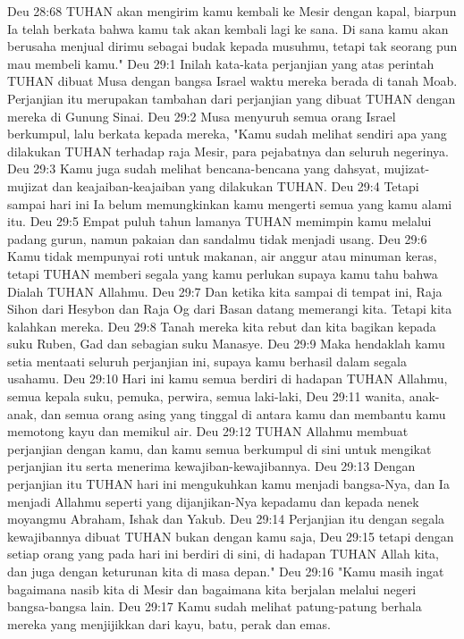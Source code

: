 Deu 28:68  TUHAN akan mengirim kamu kembali ke Mesir dengan kapal, biarpun Ia telah berkata bahwa kamu tak akan kembali lagi ke sana. Di sana kamu akan berusaha menjual dirimu sebagai budak kepada musuhmu, tetapi tak seorang pun mau membeli kamu."
Deu 29:1  Inilah kata-kata perjanjian yang atas perintah TUHAN dibuat Musa dengan bangsa Israel waktu mereka berada di tanah Moab. Perjanjian itu merupakan tambahan dari perjanjian yang dibuat TUHAN dengan mereka di Gunung Sinai.
Deu 29:2  Musa menyuruh semua orang Israel berkumpul, lalu berkata kepada mereka, "Kamu sudah melihat sendiri apa yang dilakukan TUHAN terhadap raja Mesir, para pejabatnya dan seluruh negerinya.
Deu 29:3  Kamu juga sudah melihat bencana-bencana yang dahsyat, mujizat-mujizat dan keajaiban-keajaiban yang dilakukan TUHAN.
Deu 29:4  Tetapi sampai hari ini Ia belum memungkinkan kamu mengerti semua yang kamu alami itu.
Deu 29:5  Empat puluh tahun lamanya TUHAN memimpin kamu melalui padang gurun, namun pakaian dan sandalmu tidak menjadi usang.
Deu 29:6  Kamu tidak mempunyai roti untuk makanan, air anggur atau minuman keras, tetapi TUHAN memberi segala yang kamu perlukan supaya kamu tahu bahwa Dialah TUHAN Allahmu.
Deu 29:7  Dan ketika kita sampai di tempat ini, Raja Sihon dari Hesybon dan Raja Og dari Basan datang memerangi kita. Tetapi kita kalahkan mereka.
Deu 29:8  Tanah mereka kita rebut dan kita bagikan kepada suku Ruben, Gad dan sebagian suku Manasye.
Deu 29:9  Maka hendaklah kamu setia mentaati seluruh perjanjian ini, supaya kamu berhasil dalam segala usahamu.
Deu 29:10  Hari ini kamu semua berdiri di hadapan TUHAN Allahmu, semua kepala suku, pemuka, perwira, semua laki-laki,
Deu 29:11  wanita, anak-anak, dan semua orang asing yang tinggal di antara kamu dan membantu kamu memotong kayu dan memikul air.
Deu 29:12  TUHAN Allahmu membuat perjanjian dengan kamu, dan kamu semua berkumpul di sini untuk mengikat perjanjian itu serta menerima kewajiban-kewajibannya.
Deu 29:13  Dengan perjanjian itu TUHAN hari ini mengukuhkan kamu menjadi bangsa-Nya, dan Ia menjadi Allahmu seperti yang dijanjikan-Nya kepadamu dan kepada nenek moyangmu Abraham, Ishak dan Yakub.
Deu 29:14  Perjanjian itu dengan segala kewajibannya dibuat TUHAN bukan dengan kamu saja,
Deu 29:15  tetapi dengan setiap orang yang pada hari ini berdiri di sini, di hadapan TUHAN Allah kita, dan juga dengan keturunan kita di masa depan."
Deu 29:16  "Kamu masih ingat bagaimana nasib kita di Mesir dan bagaimana kita berjalan melalui negeri bangsa-bangsa lain.
Deu 29:17  Kamu sudah melihat patung-patung berhala mereka yang menjijikkan dari kayu, batu, perak dan emas.

